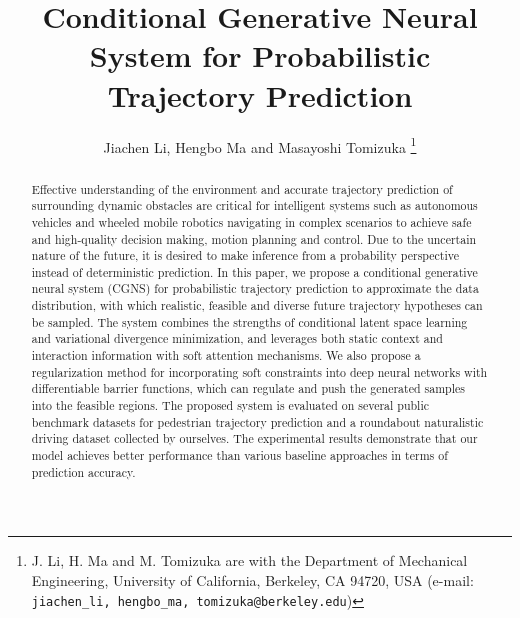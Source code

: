 \documentclass[letterpaper, 10 pt, conference]{ieeeconf}
\title{\LARGE \bf
Conditional Generative Neural System for Probabilistic \\Trajectory Prediction
}
\author{Jiachen Li, Hengbo Ma and Masayoshi Tomizuka
\thanks{J. Li, H. Ma and M. Tomizuka are with the Department of Mechanical Engineering, 
		University of California, Berkeley, CA 94720, USA
		(e-mail: {\tt\small jiachen\_li, hengbo\_ma, tomizuka@berkeley.edu})}}
\begin{document}
\maketitle
\thispagestyle{empty}
\pagestyle{empty}


\begin{abstract}
Effective understanding of the environment and accurate trajectory prediction of surrounding dynamic obstacles are critical for intelligent systems such as autonomous vehicles and wheeled mobile robotics navigating in complex scenarios to achieve safe and high-quality decision making, motion planning and control. Due to the uncertain nature of the future, it is desired to make inference from a probability perspective instead of deterministic prediction.
In this paper, we propose a conditional generative neural system (CGNS) for probabilistic trajectory prediction to approximate the data distribution, with which realistic, feasible and diverse future trajectory hypotheses can be sampled. 
The system combines the strengths of conditional latent space learning and variational divergence minimization, and leverages both static context and interaction information with soft attention mechanisms.
We also propose a regularization method for incorporating soft constraints into deep neural networks with differentiable barrier functions, which can regulate and push the generated samples into the feasible regions.
The proposed system is evaluated on several public benchmark datasets for pedestrian trajectory prediction and a roundabout naturalistic driving dataset collected by ourselves. The experimental results demonstrate that our model achieves better performance than various baseline approaches in terms of prediction accuracy.
\end{abstract}
\end{document}

